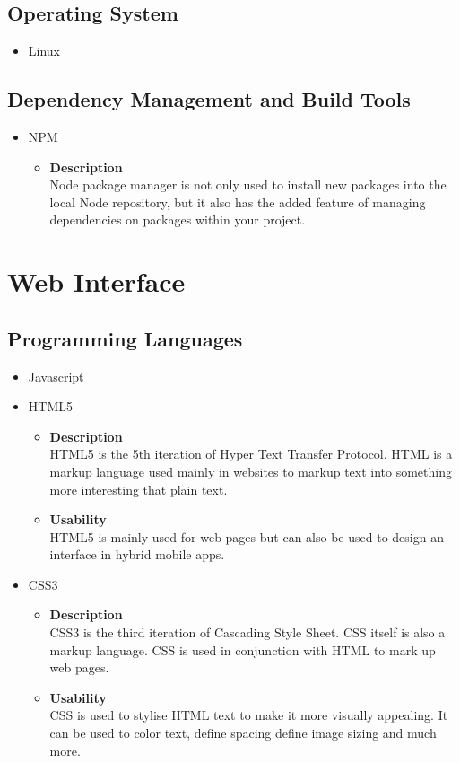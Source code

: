 \documentclass[11pt,fleqn]{book} %
\begin{document}
	\subsection{Operating System}
	\begin{itemize}
		\item Linux
	\end{itemize}
	\subsection{Dependency Management and Build Tools}
	\begin{itemize}
		\item NPM
		\begin{itemize}
			\item \textbf{Description}\\
			Node package manager is not only used to install new packages into the local Node repository, but it also has the added feature of managing dependencies on packages within your project.
		\end{itemize}
	\end{itemize}
	\section{Web Interface}
	\subsection{Programming Languages}
	\begin{itemize}
		\item Javascript
		\item HTML5
		\begin{itemize}
			\item \textbf{Description}\\
			HTML5 is the 5th iteration of Hyper Text Transfer Protocol. HTML is a markup language used mainly in websites to markup text into something more interesting that plain text.
			\item \textbf{Usability}\\
			HTML5 is mainly used for web pages but can also be used to design an interface in hybrid mobile apps.
		\end{itemize}
		\item CSS3
		\begin{itemize}
			\item \textbf{Description}\\
			CSS3 is the third iteration of Cascading Style Sheet. CSS itself is also a markup language. CSS is used in conjunction with HTML to mark up web pages.
			\item \textbf{Usability}\\
			CSS is used to stylise HTML text to make it more visually appealing. It can be used to color text, define spacing define image sizing and much more.
		\end{itemize}
	\end{itemize}
\end{document}
